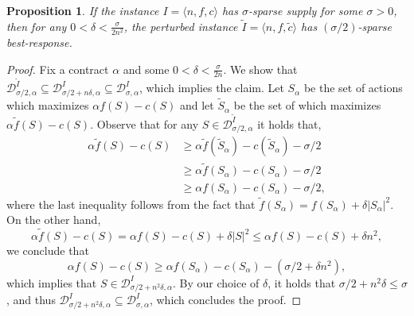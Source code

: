 \documentclass[11pt]{article}
\newtheorem{proposition}{Proposition}
\newcommand{\instanceI}{I=\langle n, f, c \rangle}
\newcommand{\inst}[3]{\langle #1, #2, #3 \rangle}
\newcommand{\demand}[2]{\mathcal{D}_{{#1},{#2}}}
\newcommand{\BR}[3]{\demand{#1}{#2}^{#3}}
\newcommand{\BRI}[2]{\BR{#1}{#2}{I}}
\newcommand{\tc}{\tilde{c}}
\newcommand{\tf}{\tilde{f}}
\newcommand{\tI}{\tilde{I}}
\newcommand{\InstTildeI}{\tI = \inst{n}{f}{\tc}}
\begin{document}
\begin{proposition}\label{prop:sparse_demand_supmod_f_c}
    If the instance $\instanceI$ has $\sigma$-sparse supply for some $\sigma > 0$, then for any $0 < \delta < \frac{\sigma}{2n^2}$, the perturbed instance $\InstTildeI$ has $(\sigma/2)$-sparse best-response.
\end{proposition}
\begin{proof}
\newcommand{\sa}{S_\alpha}
\newcommand{\tsa}{\tilde{S}_\alpha}
    Fix a contract $\alpha$ and some $0 < \delta < \frac{\sigma}{2n}$. We show that 
    $\BR{\sigma/2}{\alpha}{\tI} \subseteq \BRI{\sigma/2+n\delta}{\alpha} \subseteq \BRI{\sigma}{\alpha}$, which implies the claim.
    Let $\sa$ be the set of actions which maximizes $\alpha f(S) - c(S)$ and let $\tsa$ be the set of which maximizes $\alpha \tf(S) - c(S)$.
    Observe that for any $S \in \BR{\sigma/2}{\alpha}{\tI}$
    it holds that,
    \begin{align*}
        \alpha \tf(S) - c(S) 
        &\ge \alpha \tf(\tsa) - c(\tsa) - \sigma/2 \\
        &\ge \alpha \tf(\sa) - c(\sa) - \sigma/2 \\
        &\ge \alpha f(\sa) - c(\sa) - \sigma/2,
    \end{align*}
    where the last inequality follows from the fact that $\tf(\sa) = f(\sa) + \delta|\sa|^2$.
    On the other hand, 
    $$\alpha \tf(S) - c(S) = \alpha f(S) - c(S) + \delta|S|^2 \le \alpha f(S) - c(S) + \delta n^2,$$ 
    we conclude that 
    \[
    \alpha f(S) - c(S) \ge \alpha f(\sa) - c(\sa) - (\sigma/2 + \delta n^2),
    \]
    which implies that $S \in \BRI{\sigma/2+n^2\delta}{\alpha}$.
    By our choice of $\delta$, it holds that $\sigma/2+n^2\delta \le \sigma$, and thus $\BRI{\sigma/2+n^2\delta}{\alpha} \subseteq \BRI{\sigma}{\alpha}$, which concludes the proof.
\end{proof}
    
\end{document}
